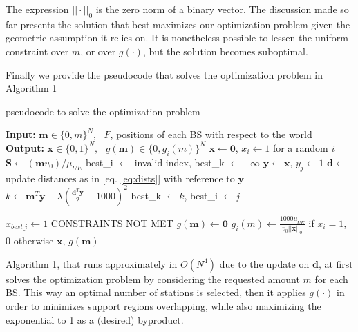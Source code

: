 \documentclass[conference,10pt]{IEEEtran}
\begin{document}
The expression $||\cdot||_0$ is the zero norm of a binary vector. The discussion made so far presents the solution that best maximizes our optimization problem given the geometric assumption it relies on. It is nonetheless possible to lessen the uniform constraint over $m$, or over $g(\cdot)$, but the solution becomes suboptimal. 

Finally we provide the pseudocode that solves the optimization problem in Algorithm 1

\begin{algorithm}
	\caption{pseudocode to solve the optimization problem}
	\begin{algorithmic}
		\STATE \textbf{Input:} $\mathbf{m} \in \{0, m\}^N, \textrm{ } F$, positions of each BS with respect to the world
		\STATE \textbf{Output:} $\mathbf{x} \in \{0, 1\}^N, \textrm{ } g(\mathbf{m}) \in \{0, g_i(m)\}^N$
		\STATE \null
			\STATE $\mathbf{x} \leftarrow \mathbf{0}$, $x_i \leftarrow 1$ for a random $i$
			\STATE $\mathbf{S} \leftarrow (\mathbf{m}v_0)/\mu_{U\!E}$
				\STATE best_i $\leftarrow$ invalid index, best_k $\leftarrow -\infty$ 
					\STATE $\mathbf{y} \leftarrow \mathbf{x}$, $y_j \leftarrow 1$
					\STATE $\mathbf{d} \leftarrow$ update distances as in [eq. \ref{eq:dists}] with reference to    	$\mathbf{y}$
					\STATE $k \leftarrow \mathbf{m}^T\mathbf{y} - \lambda\left(\frac{\mathbf{d}^T\mathbf{y}}{2} - 1000\right)^2$
						\STATE best_k $\leftarrow k$, best_i  $\leftarrow j$
					\ENDIF
				\ENDFOR 
				
					\STATE $x_{best\_i} \leftarrow 1$
				\ELSE
					\STATE CONSTRAINTS NOT MET
				\ENDIF
			\ENDWHILE
			\STATE $g(\mathbf{m}) \leftarrow \mathbf{0}$
				\STATE 	$g_i(m)\leftarrow \frac{1000\mu_{U\!E}}{v_0||\mathbf{x}||_0}$ if $x_i=1$, 0 otherwise
 			\ENDFOR
			\RETURN $\mathbf{x}$, $g(\mathbf{m})$
	\end{algorithmic}
\end{algorithm}


Algorithm 1, that runs approximately in $O(N^4)$ due to the update on $\mathbf{d}$, at first solves the optimization problem by considering the requested amount $m$ for each BS. This way an optimal number of stations is selected, then it applies $g(\cdot)$ in order to minimizes support regions overlapping, while also maximizing the exponential to 1 as a (desired) byproduct.
\end{document}
